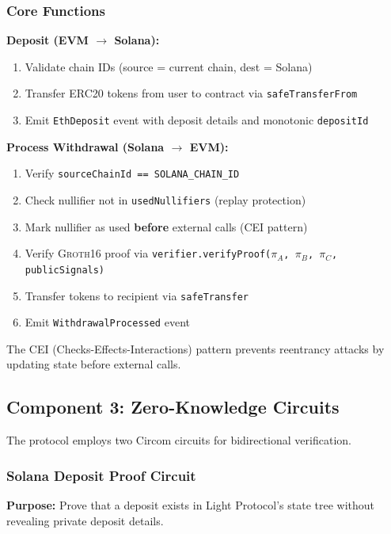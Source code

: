 \documentclass[11pt,a4paper,twoside]{article}
\newcommand{\groth}{\textsc{Groth16}}
\begin{document}
\subsubsection{Core Functions}

\textbf{Deposit (EVM $\rightarrow$ Solana):}
\begin{enumerate}
    \item Validate chain IDs (source = current chain, dest = Solana)
    \item Transfer ERC20 tokens from user to contract via \texttt{safeTransferFrom}
    \item Emit \texttt{EthDeposit} event with deposit details and monotonic \texttt{depositId}
\end{enumerate}

\textbf{Process Withdrawal (Solana $\rightarrow$ EVM):}
\begin{enumerate}
    \item Verify \texttt{sourceChainId == SOLANA\_CHAIN\_ID}
    \item Check nullifier not in \texttt{usedNullifiers} (replay protection)
    \item Mark nullifier as used \textbf{before} external calls (CEI pattern)
    \item Verify \groth{} proof via \texttt{verifier.verifyProof($\pi_A$, $\pi_B$, $\pi_C$, publicSignals)}
    \item Transfer tokens to recipient via \texttt{safeTransfer}
    \item Emit \texttt{WithdrawalProcessed} event
\end{enumerate}

The CEI (Checks-Effects-Interactions) pattern prevents reentrancy attacks by updating state before external calls.

\subsection{Component 3: Zero-Knowledge Circuits}

The protocol employs two Circom circuits for bidirectional verification.

\subsubsection{Solana Deposit Proof Circuit}

\textbf{Purpose:} Prove that a deposit exists in Light Protocol's state tree without revealing private deposit details.
\end{document}
